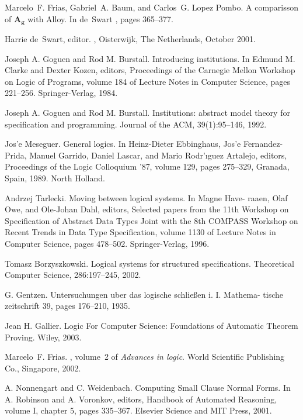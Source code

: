 \begin{thebibliography}{tesis}
Marcelo~{F.} Frias, Gabriel~{A.} Baum, and Carlos~{G.} {Lopez Pombo}.
\newblock A comparisson of $\mathbf{A_g}$ with {Alloy}.
\newblock In de~Swart \cite{relmics01}, pages 365--377.

Harrie de~Swart, editor.
, Oisterwijk, The Netherlands, October 2001.
  
	Joseph A. Goguen and Rod M. Burstall. Introducing institutions. In Edmund M. Clarke and Dexter Kozen, editors, Proceedings of the Carnegie Mellon Workshop on Logic of Programs, volume 184 of Lecture Notes in Computer Science, pages 221–256. Springer-Verlag, 1984.

  Joseph A. Goguen and Rod M. Burstall. Institutions: abstract model theory for specification and programming. Journal of the ACM, 39(1):95–146, 1992.

	Jos'e Meseguer. General logics. In Heinz-Dieter Ebbinghaus, Jos'e Fernandez-Prida, Manuel Garrido, Daniel Lascar, and Mario Rodr'ıguez Artalejo, editors, Proceedings of the Logic Colloquium ’87, volume 129, pages 275–329, Granada, Spain, 1989. North Holland.

	Andrzej Tarlecki. Moving between logical systems. In Magne Have- raaen, Olaf Owe, and Ole-Johan Dahl, editors, Selected papers from the 11th Workshop on Specification of Abstract Data Types Joint with the 8th COMPASS Workshop on Recent Trends in Data Type Specification, volume 1130 of Lecture Notes in Computer Science, pages 478–502. Springer-Verlag, 1996.

	Tomasz Borzyszkowski. Logical systems for structured specifications. Theoretical Computer Science, 286:197–245, 2002.

	G. Gentzen. Untersuchungen uber das logische schließen i. I. Mathema- tische zeitschrift 39, pages 176–210, 1935.
	
	Jean H. Gallier. Logic For Computer Science: Foundations of Automatic Theorem Proving. Wiley, 2003.

Marcelo~{F.} Frias.
, volume~2
  of {\em Advances in logic}.
\newblock World Scientific Publishing Co., Singapore, 2002.

	A. Nonnengart and C. Weidenbach. Computing Small Clause Normal Forms. In A. Robinson and A. Voronkov, editors, Handbook of Automated Reasoning, volume I, chapter 5, pages 335–367. Elsevier Science and MIT Press, 2001.


\end{thebibliography}
